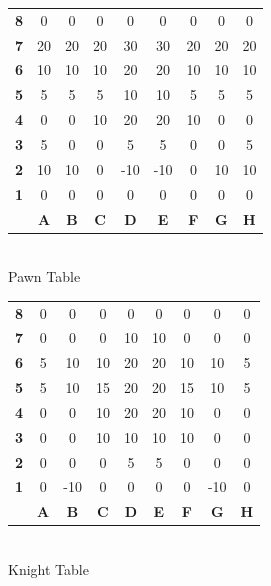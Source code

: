 \documentclass[11pt]{article}
\begin{document}
\begin{center}
\begin{tabular}{c c c c c c c c c}
\textbf{8} & 0  & 0  & 0  & 0  & 0  & 0  & 0  & 0  \\
\textbf{7} & 20 & 20 & 20 & 30 & 30 & 20 & 20 & 20 \\
\textbf{6} & 10 & 10 & 10 & 20 & 20 & 10 & 10 & 10 \\
\textbf{5} & 5  & 5  & 5  & 10 & 10 & 5  & 5  & 5  \\
\textbf{4} & 0  & 0  & 10 & 20 & 20 & 10 & 0  & 0  \\
\textbf{3} & 5  & 0  & 0  & 5  & 5  & 0  & 0  & 5  \\
\textbf{2} & 10 & 10 & 0  &-10 &-10 & 0  & 10 & 10 \\
\textbf{1} & 0  & 0  & 0  & 0  & 0  & 0  & 0  & 0  \\
  & \textbf{A}  & \textbf{B}  & \textbf{C}  & \textbf{D}  & \textbf{E}  & \textbf{F}  & \textbf{G}  & \textbf{H}
\end{tabular} \\
Pawn Table
\end{center} 

\begin{center}
\begin{tabular}{c c c c c c c c c}
\textbf{8} & 0  & 0  & 0  & 0  & 0  & 0  & 0  & 0  \\
\textbf{7} & 0  & 0  & 0  & 10 & 10 & 0  & 0  & 0 \\
\textbf{6} & 5  & 10 & 10 & 20 & 20 & 10 & 10 & 5 \\
\textbf{5} & 5  & 10 & 15 & 20 & 20 & 15 & 10 & 5  \\
\textbf{4} & 0  & 0  & 10 & 20 & 20 & 10 & 0  & 0  \\
\textbf{3} & 0  & 0  & 10 & 10 & 10 & 10 & 0  & 0  \\
\textbf{2} & 0  & 0  & 0  & 5  & 5  & 0  & 0  & 0 \\
\textbf{1} & 0  &-10 & 0  & 0  & 0  & 0  &-10 & 0  \\
  & \textbf{A}  & \textbf{B}  & \textbf{C}  & \textbf{D}  & \textbf{E}  & \textbf{F}  & \textbf{G}  & \textbf{H}
\end{tabular} \\
Knight Table
\end{center} 
\end{document}
